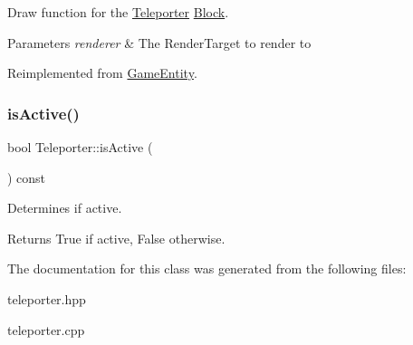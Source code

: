 Draw function for the \mbox{\hyperlink{class_teleporter}{Teleporter}} \mbox{\hyperlink{class_block}{Block}}. 


\begin{DoxyParams}{Parameters}
{\em renderer} & The Render\+Target to render to \\
\hline
\end{DoxyParams}


Reimplemented from \mbox{\hyperlink{class_game_entity_ae8417c4fa668594827706c44091f7366}{Game\+Entity}}.

\mbox{\label{class_teleporter_a4fb9e6851132a1ffb8fbec7b95972ed1}} 
\subsubsection{\texorpdfstring{isActive()}{isActive()}}
{\footnotesize\ttfamily bool Teleporter\+::is\+Active (\begin{DoxyParamCaption}{ }\end{DoxyParamCaption}) const\hspace{0.3cm}{\ttfamily [inline]}}



Determines if active. 

\begin{DoxyReturn}{Returns}
True if active, False otherwise. 
\end{DoxyReturn}


The documentation for this class was generated from the following files\+:\begin{DoxyCompactItemize}
\item 
teleporter.\+hpp\item 
teleporter.\+cpp\end{DoxyCompactItemize}
